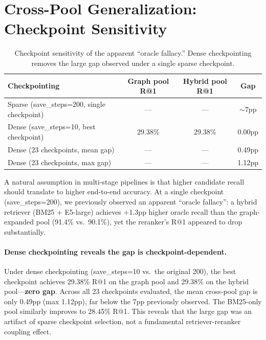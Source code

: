 \documentclass{article}
\begin{document}
\section{Cross-Pool Generalization: Checkpoint Sensitivity}
\label{app:coupling}

\begin{table}[h]
\centering
\caption{Checkpoint sensitivity of the apparent ``oracle fallacy.'' Dense checkpointing removes the large gap observed under a single sparse checkpoint.}
\label{fig:oracle_fallacy}
\small
\begin{tabular}{lccc}
\toprule
\textbf{Checkpointing} & \textbf{Graph pool R@1} & \textbf{Hybrid pool R@1} & \textbf{Gap} \\
\midrule
Sparse (save\_steps=200, single checkpoint) & --- & --- & $\sim$7pp \\
Dense (save\_steps=10, best checkpoint) & 29.38\% & 29.38\% & 0.00pp \\
Dense (23 checkpoints, mean gap) & --- & --- & 0.49pp \\
Dense (23 checkpoints, max gap) & --- & --- & 1.12pp \\
\bottomrule
\end{tabular}
\end{table}

A natural assumption in multi-stage pipelines is that higher candidate recall should translate to higher end-to-end accuracy.
At a single checkpoint (save\_steps=200), we previously observed an apparent ``oracle fallacy'': a hybrid retriever (BM25 + E5-large) achieves $+$1.3pp higher oracle recall than the graph-expanded pool (91.4\% vs.\ 90.1\%), yet the reranker's R@1 appeared to drop substantially.

\paragraph{Dense checkpointing reveals the gap is checkpoint-dependent.}
Under dense checkpointing (save\_steps=10 vs.\ the original 200), the best checkpoint achieves 29.38\% R@1 on the graph pool and 29.38\% on the hybrid pool---\textbf{zero gap}.
Across all 23 checkpoints evaluated, the mean cross-pool gap is only 0.49pp (max 1.12pp), far below the 7pp previously observed.
The BM25-only pool similarly improves to 28.45\% R@1.
This reveals that the large gap was an artifact of sparse checkpoint selection, not a fundamental retriever-reranker coupling effect.
\end{document}
